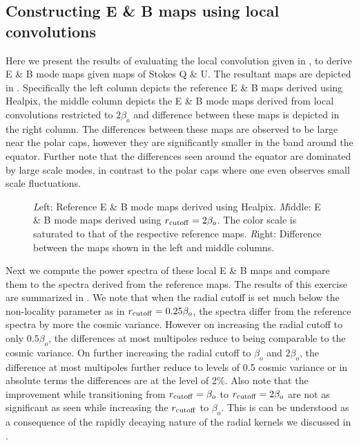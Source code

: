 \subsection{Constructing E \& B maps using local convolutions}
Here we present the results of evaluating the local convolution given in , to derive E \& B mode maps given maps of Stokes Q \& U. The resultant maps are depicted in . Specifically the left column depicts the reference E \& B maps derived using Healpix, the middle column depicts the E \& B mode maps derived from local convolutions restricted to $2\beta_o$ and difference between these maps is depicted in the right column. The differences between these maps are observed to be large near the polar caps, however they are significantly smaller in the band around the equator. Further note that the differences seen around the equator are dominated by large scale modes, in contrast to the polar caps where one even observes small scale fluctuations.
%
\begin{figure}[!t] 
\centering
{}
\caption{{\textit Left:} Reference E \& B mode maps derived using Healpix. {\textit Middle:} E \& B mode maps derived using $r_{\rm cutoff}=2\beta_o$. The color scale is saturated to that of the respective reference maps. {\textit Right:} Difference between the maps shown in the left and middle columns.}
\label{fig:eb-maps-compare}
\end{figure}
%

Next we compute the power spectra of these local E \& B maps and compare them to the spectra derived from the reference maps. The results of this exercise are summarized in . We note that when the radial cutoff is set much below the non-locality parameter as in $r_{\rm cutoff}=0.25 \beta_o$, the spectra differ from the reference spectra by more the cosmic variance. However on increasing the radial cutoff to only $0.5\beta_o$, the differences at most multipoles reduce to being comparable to the cosmic variance. On further increasing the radial cutoff to $\beta_o$ and $2 \beta_o$, the difference at most multipoles further reduce to levels of 0.5 cosmic variance or in absolute terms the differences are at the level of 2\%. Also note that the improvement while transitioning from $r_{\rm cutoff}=\beta_o$ to $r_{\rm cutoff}=2 \beta_o$ are not as significant 
as seen while increasing the $r_{\rm cutoff}$ to $\beta_o$. This is can be understood as a consequence of the rapidly decaying nature of the radial kernels we discussed in . 

